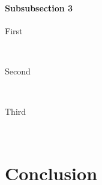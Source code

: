 \documentclass[12pt]{report} %
\begin{document}

\subsubsection{Subsubsection 3} %

\begin{description} %

\item[First] \hfill \\
\lipsum[9] %

\item[Second] \hfill \\
\lipsum[10] %

\item[Third] \hfill \\
\lipsum[11] %

\end{description} 









\chapter{Conclusion} %
\end{document}
